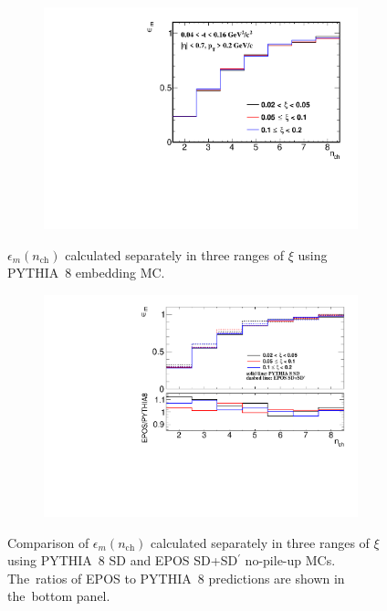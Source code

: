 \begin{figure}[t!]
	\centering
	\begin{subfigure}{.49\textwidth}
		\includegraphics[width=\textwidth,page=1]{chapters/chrgSTAR/img/unfolding/correction_0.pdf}
	\end{subfigure}
	\hfill
	\begin{minipage}{.47\textwidth}
		\caption{$\epsilon_{m}(n_\textrm{ch})$  calculated separately in three ranges of $\xi$ using PYTHIA~8 embedding MC.}
		\label{fig:correctionSTAR}
	\end{minipage}
	
\end{figure}

\begin{figure}[t!]
	\centering
	\begin{subfigure}{.47\textwidth}
		\includegraphics[width=\textwidth,page=1]{chapters/chrgSTAR/img/unfolding/nch_m2_nsel_s2.pdf}
	\end{subfigure}
	\hfill
	\begin{minipage}{.48\textwidth}
		\caption{Comparison of $\epsilon_{m}(n_\textrm{ch})$  calculated separately in three ranges of $\xi$ using PYTHIA~8 SD and EPOS SD+SD$^\prime$ no-pile-up MCs. The~ratios of EPOS to PYTHIA~8 predictions are shown in the~bottom panel.}
		\label{fig:correctionSTAR_syst}
	\end{minipage}
	
\end{figure}

